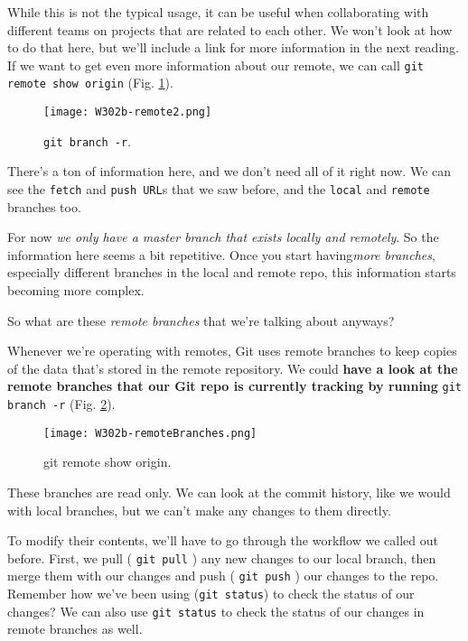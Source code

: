 	While this is not the typical usage, it can be useful when collaborating with different teams on projects that are related to each other. We won't look at how to do that here, but we'll include a link for more information in the next reading. If we want to get even more information about our remote, we can call \verb|git remote show origin| (Fig. \ref{W302b-remote2}).
	
	\begin{figure} 
		\caption{\texttt{git branch -r}.}
		\centering
		\texttt{[image: W302b-remote2.png]}
		\label{W302b-remote2}
	\end{figure}
	
	There's a ton of information here, and we don't need all of it right now. We can see the \texttt{fetch} and \texttt{push URL}s that we saw before, and the \texttt{local} and \texttt{remote} branches too.
	
	For now \textit{we only have a master branch that exists locally and remotely}. So the information here seems a bit repetitive. Once you start having\textit{more branches}, especially different branches in the local and remote repo, this information starts becoming more complex.
	
	So what are these \textit{remote branches} that we're talking about anyways?
	
	Whenever we're operating with remotes, Git uses remote branches to keep copies of the data that's stored in the remote repository. We could \textbf{have a look at the remote branches that our Git repo is currently tracking by running} \verb|git branch -r| (Fig. \ref{W302b-remoteBranches}).
	
	\begin{figure} 
		\caption{git remote show origin.}
		\centering
		\texttt{[image: W302b-remoteBranches.png]}
		\label{W302b-remoteBranches}
	\end{figure}
	
	These branches are read only. We can look at the commit history, like we would with local branches, but we can't make any changes to them directly. 
	
	To modify their contents, we'll have to go through the workflow we called out before.
	First, we pull ( \verb|git pull| ) any new changes to our local branch, then merge them with our changes and push ( \verb|git push| ) our changes to the repo.
	Remember how we've been using (\verb|git status|) to check the status of our changes? We can also use \verb|git status| to check the status of our changes in remote branches as well.
	
